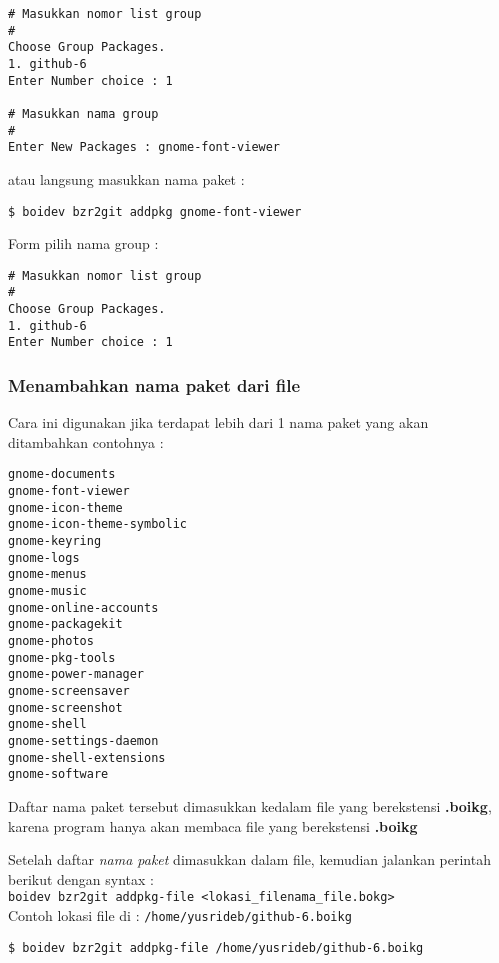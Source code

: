 {\begin{lstlisting}[language=ShellBash]
# Masukkan nomor list group
#
Choose Group Packages.
1. github-6
Enter Number choice : 1

# Masukkan nama group 
#
Enter New Packages : gnome-font-viewer
\end{lstlisting}

\noindent
atau langsung masukkan nama paket :

\begin{lstlisting}[language=ShellBash]
$ boidev bzr2git addpkg gnome-font-viewer
\end{lstlisting}

\noindent
Form pilih nama group :

\begin{lstlisting}[language=ShellBash]
# Masukkan nomor list group
#
Choose Group Packages.
1. github-6
Enter Number choice : 1
\end{lstlisting}

\subsubsection{Menambahkan nama paket dari file}
\label{subsubsec:addpkg-file}
\noindent
Cara ini digunakan jika terdapat lebih dari 1 nama paket yang akan ditambahkan contohnya :

\begin{lstlisting}[language=ShellBash]
gnome-documents
gnome-font-viewer
gnome-icon-theme
gnome-icon-theme-symbolic
gnome-keyring
gnome-logs
gnome-menus
gnome-music
gnome-online-accounts
gnome-packagekit
gnome-photos
gnome-pkg-tools
gnome-power-manager
gnome-screensaver
gnome-screenshot
gnome-shell
gnome-settings-daemon
gnome-shell-extensions
gnome-software
\end{lstlisting}

\noindent
Daftar nama paket tersebut dimasukkan kedalam file yang berekstensi \textbf{.boikg}, karena program hanya akan membaca file yang berekstensi \textbf{.boikg}

\noindent
Setelah daftar \textit{nama paket} dimasukkan dalam file, kemudian jalankan perintah berikut dengan syntax :\\ {\small \texttt{boidev bzr2git addpkg-file <lokasi\_file\/nama\_file.bokg>}}\\
Contoh lokasi file di : {\small \texttt{/home/yusrideb/github-6.boikg}}

\begin{lstlisting}[language=ShellBash]
$ boidev bzr2git addpkg-file /home/yusrideb/github-6.boikg
\end{lstlisting}

}
